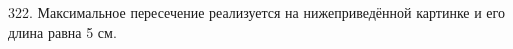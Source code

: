322. Максимальное пересечение реализуется на нижеприведённой картинке и его длина равна 5 см.\\
\begin{figure}[ht!]
\end{figure}\\
